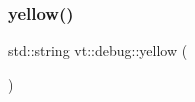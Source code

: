 \mbox{\label{namespacevt_1_1debug_ad85c9e5ee0f986151a01212647d2b60d}} 
\subsubsection{\texorpdfstring{yellow()}{yellow()}}
{\footnotesize\ttfamily std\+::string vt\+::debug\+::yellow (\begin{DoxyParamCaption}{ }\end{DoxyParamCaption})\hspace{0.3cm}{\ttfamily [inline]}}

